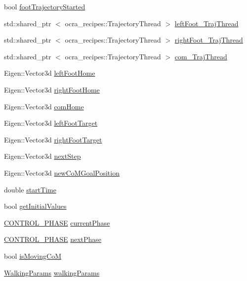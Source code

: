 \begin{DoxyCompactItemize}
bool \hyperlink{classSteppingDemoClient_a6036e2d0b604648ca39e4d64b41a9d6e}{foot\-Trajectory\-Started}
\item 
std\-::shared\-\_\-ptr\*
$<$ ocra\-\_\-recipes\-::\-Trajectory\-Thread $>$ \hyperlink{classSteppingDemoClient_afd18627088c2c12f172ff9e976da5330}{left\-Foot\-\_\-\-Traj\-Thread}
\item 
std\-::shared\-\_\-ptr\*
$<$ ocra\-\_\-recipes\-::\-Trajectory\-Thread $>$ \hyperlink{classSteppingDemoClient_a8b4b931d41b47d9923417506fac107f3}{right\-Foot\-\_\-\-Traj\-Thread}
\item 
std\-::shared\-\_\-ptr\*
$<$ ocra\-\_\-recipes\-::\-Trajectory\-Thread $>$ \hyperlink{classSteppingDemoClient_a9f3d1cdc49cc26a10f9b8fb0d0c68cab}{com\-\_\-\-Traj\-Thread}
\item 
\-Eigen\-::\-Vector3d \hyperlink{classSteppingDemoClient_acd4cb9dbe053979701574f5d1d4ef349}{left\-Foot\-Home}
\item 
\-Eigen\-::\-Vector3d \hyperlink{classSteppingDemoClient_ae2a3bdaafc7784b5afece8ae9ebaff7d}{right\-Foot\-Home}
\item 
\-Eigen\-::\-Vector3d \hyperlink{classSteppingDemoClient_aa018c1f2734d63f962be512461c9e010}{com\-Home}
\item 
\-Eigen\-::\-Vector3d \hyperlink{classSteppingDemoClient_a2360933e2902d1b1a374787bd67e14e7}{left\-Foot\-Target}
\item 
\-Eigen\-::\-Vector3d \hyperlink{classSteppingDemoClient_abfe6635a0ad50fa4baa6fa10b8c56d9e}{right\-Foot\-Target}
\item 
\-Eigen\-::\-Vector3d \hyperlink{classSteppingDemoClient_af9e0358390f12ed0135275b20bf1f6f5}{next\-Step}
\item 
\-Eigen\-::\-Vector3d \hyperlink{classSteppingDemoClient_ab4a77111abbf3630280a64d17ac59eef}{new\-Co\-M\-Goal\-Position}
\item 
double \hyperlink{classSteppingDemoClient_af7b6e48319ef9d35fb975edc3bb2a137}{start\-Time}
\item 
bool \hyperlink{classSteppingDemoClient_aedd8bb5bca60afbdd2b8de3b5d1829d7}{get\-Initial\-Values}
\item 
\hyperlink{SteppingDemoClient_8h_af2a8507bf21c3ce9b0e67a23381251c6}{\-C\-O\-N\-T\-R\-O\-L\-\_\-\-P\-H\-A\-S\-E} \hyperlink{classSteppingDemoClient_afe0aa2a02ea8117d644bf5444a03ac62}{current\-Phase}
\item 
\hyperlink{SteppingDemoClient_8h_af2a8507bf21c3ce9b0e67a23381251c6}{\-C\-O\-N\-T\-R\-O\-L\-\_\-\-P\-H\-A\-S\-E} \hyperlink{classSteppingDemoClient_ab5a3b82049a9786162a60d0ae94f96d9}{next\-Phase}
\item 
bool \hyperlink{classSteppingDemoClient_ad7e3950d053af7c1aca33b3e7c3b20c5}{is\-Moving\-Co\-M}
\item 
\hyperlink{structWalkingParams}{\-Walking\-Params} \hyperlink{classSteppingDemoClient_a113c2d838e3db1d18f4843a8828e30d4}{walking\-Params}
\end{DoxyCompactItemize}


